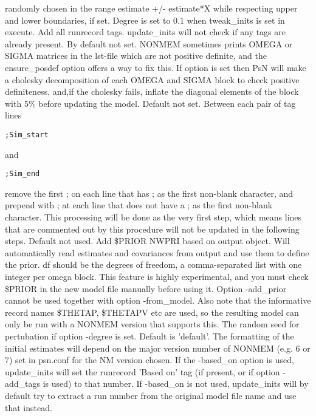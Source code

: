 \begin{optionlist}
randomly chosen in the range estimate +/- estimate*X while
respecting upper and lower boundaries, if set.
Degree is set to 0.1 when tweak\_inits is set in execute.
\nextopt
{}
Add all runrecord tags. update\_inits will not check if any tags 
are already present.
\nextopt
{}
By default not set. 
NONMEM sometimes prints OMEGA or SIGMA matrices
in the lst-file which are not positive definite, and the 
ensure\_posdef option offers a way to fix this.
If option is set then PsN will make a cholesky decomposition of
each OMEGA and SIGMA block to check positive definiteness, and,if the cholesky fails,
inflate the diagonal elements of the block with 5\% before updating the model.
\nextopt
{}
Default not set. Between each pair of tag lines
\begin{verbatim}
;Sim_start
\end{verbatim}
and
\begin{verbatim}
;Sim_end
\end{verbatim}
remove the first ; on each line that has ; as the first non-blank
character, and prepend with ; at each line that does not
have a ; as the first non-blank character.
This processing will be done as the very first step, which means lines
that are commented out by this procedure will not be updated in the following steps.
\nextopt
{}
Default not used. Add \$PRIOR NWPRI based on output object. Will automatically read
estimates and covariances from output and use them to define the 
prior. df should be the degrees of freedom, a comma-separated list
with one integer per omega block.
This feature is highly experimental, and you must check \$PRIOR 
in the new model file manually before using it.
Option -add\_prior cannot be used together with option -from\_model. 
Also note that the informative record names \$THETAP, \$THETAPV etc are used,
so the resulting model can only be run with a NONMEM version that 
supports this.
\nextopt
{}
The random seed for pertubation if option -degree is set.
\nextopt
{}
Default is 'default'. The formatting of the initial estimates will depend on the
major version number of NONMEM (e.g. 6 or 7) set in psn.conf for the
NM version chosen.
\nextopt
{}
If the -based\_on option is used, update\_inits will set 
the runrecord 'Based on' tag (if present, or if option -add\_tags is used) 
to that number. 
If -based\_on is not used, update\_inits will by default try to extract 
a run number from the original model file name and use that instead.

\end{optionlist}
